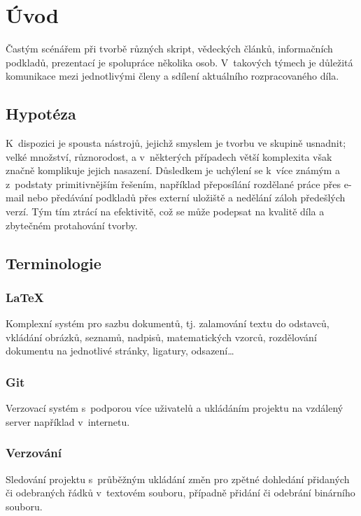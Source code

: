 \chapter{Úvod}
Častým scénářem při tvorbě různých skript, vědeckých článků, informačních podkladů, prezentací je spolupráce několika osob. V~takových týmech je důležitá komunikace mezi jednotlivými členy a sdílení aktuálního rozpracovaného díla.

\section{Hypotéza}

K~dispozici je spousta nástrojů, jejichž smyslem je tvorbu ve skupině usnadnit; velké množství, různorodost, a v~některých případech větší komplexita však značně komplikuje jejich nasazení. Důsledkem je uchýlení se k~více známým a z~podstaty primitivnějším řešením, například přeposílání rozdělané práce přes e-mail nebo předávání podkladů přes externí uložiště a nedělání záloh předešlých verzí. Tým tím ztrácí na efektivitě, což se může podepsat na kvalitě díla a zbytečném protahování tvorby.

\section{Terminologie}

\subsection{\LaTeX}

Komplexní systém pro sazbu dokumentů, tj. zalamování textu do odstavců, vkládání obrázků, seznamů, nadpisů, matematických vzorců, rozdělování dokumentu na jednotlivé stránky, ligatury, odsazení\ldots \cite{latex-def}

\subsection{Git}

Verzovací systém s~podporou více uživatelů a ukládáním projektu na vzdálený server například v~internetu.

\subsection{Verzování}

Sledování projektu s~průběžným ukládání změn pro zpětné dohledání přidaných či odebraných řádků v~textovém souboru, případně přidání či odebrání binárního souboru.

